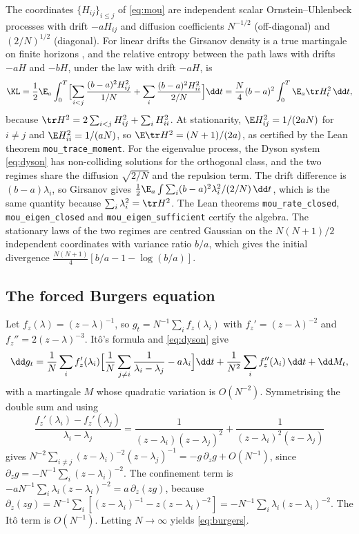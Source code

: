 The coordinates $\{H_{ij}\}_{i\le j}$ of \eqref{eq:mou} are independent scalar Ornstein--Uhlenbeck processes with drift $-aH_{ij}$ and diffusion coefficients $N^{-1/2}$ (off-diagonal) and $(2/N)^{1/2}$ (diagonal). For linear drifts the Girsanov density is a true martingale on finite horizons \citep{sarkka2019applied}, and the relative entropy between the path laws with drifts $-aH$ and $-bH$, under the law with drift $-aH$, is
\[
 \KL=\frac12\E_a\int_0^T\Bigl[\sum_{i<j}\frac{(b-a)^2H_{ij}^2}{1/N}+\sum_i\frac{(b-a)^2H_{ii}^2}{2/N}\Bigr]\dd t
 =\frac N4(b-a)^2\int_0^T\E_a\tr H_t^2\,\dd t,
\]
because $\tr H^2=2\sum_{i<j}H_{ij}^2+\sum_iH_{ii}^2$. At stationarity, $\E H_{ij}^2=1/(2aN)$ for $i\ne j$ and $\E H_{ii}^2=1/(aN)$, so $\E\tr H^2=(N+1)/(2a)$, as certified by the Lean theorem \texttt{mou\_trace\_moment}. For the eigenvalue process, the Dyson system \eqref{eq:dyson} has non-colliding solutions for the orthogonal class, and the two regimes share the diffusion $\sqrt{2/N}$ and the repulsion term. The drift difference is $(b-a)\lambda_i$, so Girsanov gives $\tfrac12\E_a\int\sum_i(b-a)^2\lambda_i^2/(2/N)\,\dd t$, which is the same quantity because $\sum_i\lambda_i^2=\tr H^2$. The Lean theorems \texttt{mou\_rate\_closed}, \texttt{mou\_eigen\_closed} and \texttt{mou\_eigen\_sufficient} certify the algebra. The stationary laws of the two regimes are centred Gaussian on the $N(N+1)/2$ independent coordinates with variance ratio $b/a$, which gives the initial divergence $\tfrac{N(N+1)}4[b/a-1-\log(b/a)]$.

\subsection*{The forced Burgers equation}

Let $f_z(\lambda)=(z-\lambda)^{-1}$, so $g_t=N^{-1}\sum_if_z(\lambda_i)$ with $f_z'=(z-\lambda)^{-2}$ and $f_z''=2(z-\lambda)^{-3}$. It\^o's formula and \eqref{eq:dyson} give
\[
 \dd g_t=\frac1N\sum_if_z'(\lambda_i)\Bigl[\frac1N\sum_{j\ne i}\frac1{\lambda_i-\lambda_j}-a\lambda_i\Bigr]\dd t+\frac1{N^2}\sum_if_z''(\lambda_i)\,\dd t+\dd M_t,
\]
with a martingale $M$ whose quadratic variation is $O(N^{-2})$. Symmetrising the double sum and using
\[
 \frac{f_z'(\lambda_i)-f_z'(\lambda_j)}{\lambda_i-\lambda_j}=\frac1{(z-\lambda_i)(z-\lambda_j)^2}+\frac1{(z-\lambda_i)^2(z-\lambda_j)}
\]
gives $N^{-2}\sum_{i\ne j}(z-\lambda_i)^{-2}(z-\lambda_j)^{-1}=-g\,\partial_zg+O(N^{-1})$, since $\partial_zg=-N^{-1}\sum_i(z-\lambda_i)^{-2}$. The confinement term is $-aN^{-1}\sum_i\lambda_i(z-\lambda_i)^{-2}=a\,\partial_z(zg)$, because $\partial_z(zg)=N^{-1}\sum_i[(z-\lambda_i)^{-1}-z(z-\lambda_i)^{-2}]=-N^{-1}\sum_i\lambda_i(z-\lambda_i)^{-2}$. The It\^o term is $O(N^{-1})$. Letting $N\to\infty$ yields \eqref{eq:burgers}.
